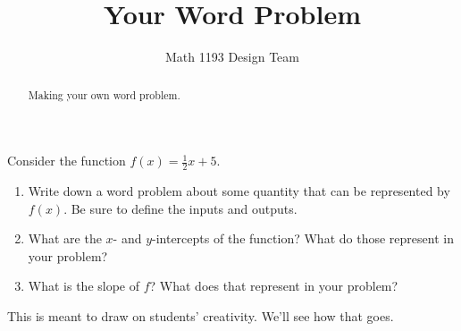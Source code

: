 \documentclass[noauthor]{ximera}
\title{Your Word Problem}
\author{Math 1193 Design Team}
\begin{document}
\begin{abstract}
    Making your own word problem.
\end{abstract}
\maketitle

Consider the function \(f(x) = \frac{1}{2}x + 5\).

\begin{enumerate}
    \item Write down a word problem about some
    quantity that can be represented by \(f(x)\).
    Be sure to define the inputs and outputs.
    \item What are the \(x\)- and \(y\)-intercepts
    of the function? What do those represent
    in your problem?
    \item What is the slope of \(f\)? What does 
    that represent in your problem?
\end{enumerate}

\begin{instructorNotes}
This is meant to draw on students' creativity. We'll see how that goes.
\end{instructorNotes}
\end{document}
